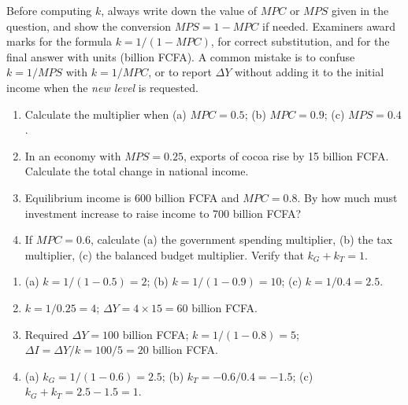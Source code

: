\documentclass[11pt]{article}
\begin{document}
\begin{attention}
Before computing $k$, always write down the value of $MPC$ or $MPS$ given in the question, and show the conversion $MPS = 1 - MPC$ if needed. Examiners award marks for the formula $k = 1/(1-MPC)$, for correct substitution, and for the final answer with units (billion FCFA). A common mistake is to confuse $k = 1/MPS$ with $k = 1/MPC$, or to report $\Delta Y$ without adding it to the initial income when the \emph{new level} is requested.
\end{attention}

\begin{exercice}[Practice]
\begin{enumerate}
\item Calculate the multiplier when (a) $MPC = 0.5$; (b) $MPC = 0.9$; (c) $MPS = 0.4$.
\item In an economy with $MPS = 0.25$, exports of cocoa rise by 15 billion FCFA. Calculate the total change in national income.
\item Equilibrium income is 600 billion FCFA and $MPC = 0.8$. By how much must investment increase to raise income to 700 billion FCFA?
\item If $MPC = 0.6$, calculate (a) the government spending multiplier, (b) the tax multiplier, (c) the balanced budget multiplier. Verify that $k_G + k_T = 1$.
\end{enumerate}
\end{exercice}

\begin{corrige}[Exercise 1]
\begin{enumerate}
\item (a) $k = 1/(1-0.5) = 2$; (b) $k = 1/(1-0.9) = 10$; (c) $k = 1/0.4 = 2.5$.
\item $k = 1/0.25 = 4$; $\Delta Y = 4 \times 15 = 60$ billion FCFA.
\item Required $\Delta Y = 100$ billion FCFA; $k = 1/(1-0.8) = 5$; $\Delta I = \Delta Y / k = 100/5 = 20$ billion FCFA.
\item (a) $k_G = 1/(1-0.6) = 2.5$; (b) $k_T = -0.6/0.4 = -1.5$; (c) $k_G + k_T = 2.5 - 1.5 = 1$.
\end{enumerate}
\end{corrige}
\end{document}

